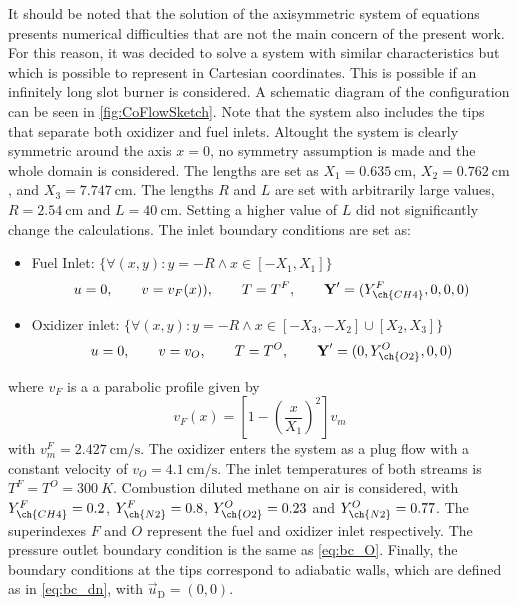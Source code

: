 It should be noted that the solution of the axisymmetric system of equations presents numerical difficulties that are not the main concern of the present work. For this reason, it was decided to solve a system with similar characteristics but which is possible to represent in Cartesian coordinates. This is possible if an infinitely long slot burner is considered. A schematic diagram of the configuration can be seen in \cref{fig:CoFlowSketch}. Note that the system also includes the tips that separate both oxidizer and fuel inlets. Altought the system is clearly symmetric around the axis $x = 0$, no symmetry assumption is made and the whole domain is considered.   The lengths are set as $X_1 = \SI{0.635}{\centi \meter}$, $X_2 = \SI{0.762}{\centi \meter}$, and $X_3 = \SI{7.747}{\centi \meter}$. The lengths $R$ and $L$ are set with arbitrarily large values,  $R = \SI{2.54}{\centi \meter}$ and $L = \SI{40}{\centi \meter}$. Setting a higher value of $L$ did not significantly change the calculations. 
The inlet boundary conditions are set as: 
\begin{itemize}
\item Fuel Inlet: $\{\forall (x,y): y = -R \land x \in [-X_1,X_1]\} $ \\
\begin{equation*}
	u = 0,\qquad v= v_F(x)), \qquad T = T^F, \qquad \vec{Y}' = (Y^F_{\ch{CH4}},0,0,0)
\end{equation*}
\item Oxidizer inlet: $\{\forall (x,y): y = -R \land x \in [-X_3,-X_2]\cup[X_2,X_3]\}$\\
\begin{equation*}
 	u = 0,\qquad v= v_O, \qquad T = T^O, \qquad \vec{Y}' = (0,Y^O_{\ch{O2}},0,0)
\end{equation*}
\end{itemize}
 where $v_F$ is a a parabolic profile given by
\begin{equation}
	v_F(x) = \left[1-\left(\frac{x}{X_1}\right)^2\right]v_m
\end{equation}
with $v^F_m = \SI{2.427}{\centi \meter \per \second}$. The oxidizer enters the system as a plug flow with a constant velocity of $v_O = \SI{4.1}{\centi \meter \per \second}$. The inlet temperatures of both streams is  $T^F = T^O = \SI{300}{K}$. Combustion diluted methane on air is considered, with $Y^F_{\ch{CH4}} = 0.2$, $Y^F_{\ch{N2}} = 0.8$, $Y^O_{\ch{O2}} = 0.23$ and $Y^O_{\ch{N2}} = 0.77$. The superindexes $F$ and $O$ represent the fuel and oxidizer inlet respectively. The pressure outlet boundary condition is the same as \cref{eq:bc_O}. Finally, the boundary conditions at the tips correspond to adiabatic walls, which are defined as in \cref{eq:bc_dn}, with $\vec{u}_{\text{D}} = (0,0)$.             

